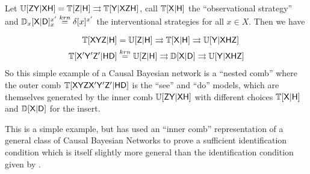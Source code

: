 Let $\mathbb{U}[\mathsf{ZY}|\mathsf{XH}] = \mathbb{T}[\mathsf{Z}|\mathsf{H}]\rightrightarrows \mathbb{T}[\mathsf{Y}|\mathsf{XZH}]$, call $\mathbb{T}[\mathsf{X}|\mathsf{H}]$ the ``observational strategy'' and $\mathbb{D}_x[\mathsf{X}|\mathsf{D}]_x^{x'} \overset{krn}{=} \delta[x]^{x'}$ the interventional strategies for all $x\in X$. Then we have

\begin{align}
    \mathbb{T}[\mathsf{XYZ}|\mathsf{H}] &= \mathbb{U}[\mathsf{Z}|\mathsf{H}]\rightrightarrows \mathbb{T}[\mathsf{X}|\mathsf{H}] \rightrightarrows \mathbb{U}[\mathsf{Y}|\mathsf{XHZ}]\\
    \mathbb{T}[\mathsf{X'Y'Z'}|\mathsf{HD}] &\overset{krn}{=} \mathbb{U}[\mathsf{Z}|\mathsf{H}]\rightrightarrows \mathbb{D}[\mathsf{X}|\mathsf{D}] \rightrightarrows \mathbb{U}[\mathsf{Y}|\mathsf{XHZ}]
\end{align}
So this simple example of a Causal Bayesian network is a ``nested comb'' where the outer comb $\mathbb{T}[\mathsf{XYZX'Y'Z'}|\mathsf{HD}]$ is the ``see'' and ``do'' models, which are themselves generated by the inner comb $\mathbb{U}[\mathsf{ZY}|\mathsf{XH}]$ with different choices $ \mathbb{T}[\mathsf{X}|\mathsf{H}]$ and $\mathbb{D}[\mathsf{X}|\mathsf{D}]$ for the insert.

This is a simple example, but \citet{jacobs_causal_2019} has used an ``inner comb'' representation of a general class of Causal Bayesian Networks to prove a sufficient identification condition which is itself slightly more general than the identification condition given by \citet{tian2002general}.